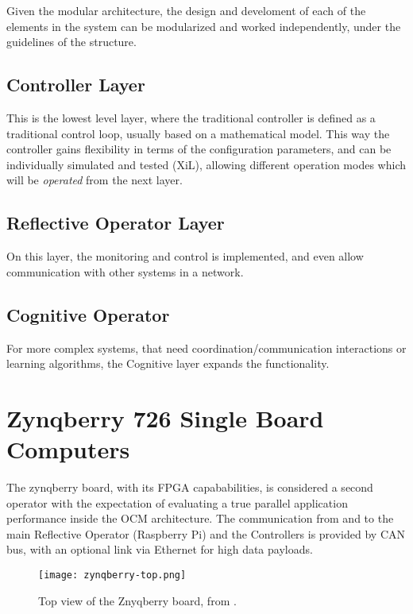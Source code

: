 Given the modular architecture, the design and develoment of each of the elements in the system can
be modularized and worked independently, under the guidelines of the structure.

\subsection*{Controller Layer}

This is the lowest level layer, where the traditional controller is defined as a traditional control
loop, usually based on a mathematical model. This way the controller gains flexibility in terms of
the configuration parameters, and can be individually simulated and tested (XiL), allowing different
operation modes which will be \textit{operated} from the next layer.

\subsection*{Reflective Operator Layer}

On this layer, the monitoring and control is implemented, and even allow communication with other
systems in a network.

\subsection*{Cognitive Operator}

For more complex systems, that need coordination/communication interactions or learning algorithms,
the Cognitive layer expands the functionality.

\section{Zynqberry 726 Single Board Computers}

The zynqberry board, with its FPGA capababilities, is considered a second operator with the
expectation of evaluating a true parallel application performance inside the OCM architecture. The
communication from and to the main Reflective Operator (Raspberry Pi) and the Controllers is
provided by CAN bus, with an optional link via Ethernet for high data payloads.

\begin{figure}[htp]
	\centering
	\texttt{[image: zynqberry-top.png]}
	\caption{Top view of the Znyqberry board, from \cite{zynq-main}.} \label{fig:znyqtop}
\end{figure}

